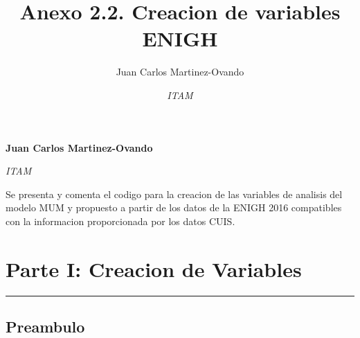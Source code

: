 \documentclass[11pt,]{article}
\title{Anexo 2.2. Creacion de variables ENIGH  }
\author{\Large Juan Carlos Martinez-Ovando\vspace{0.05in} \newline\normalsize\emph{}   \and \Large \vspace{0.05in} \newline\normalsize\emph{ITAM}  }
\date{}
\newcommand*{\authorfont}{\fontfamily{phv}\selectfont}
\renewenvironment{abstract}
 {{%
    \setlength{\leftmargin}{0mm}
    \setlength{\rightmargin}{\leftmargin}%
  }%
  \relax}
 {\endlist}
\begin{document}
	
%

{%
\setlength{\parindent}{0pt}
\thispagestyle{plain}
{\fontsize{18}{20}\selectfont\raggedright 
\maketitle  %

}

{
   \vskip 13.5pt\relax \normalsize\fontsize{11}{12} 
\textbf{\authorfont Juan Carlos Martinez-Ovando} \hskip 15pt \emph{\small }   \par \textbf{\authorfont } \hskip 15pt \emph{\small ITAM}   

}

}








\begin{abstract}

    \hbox{\vrule height .2pt width 39.14pc}

    \vskip 8.5pt %

\noindent Se presenta y comenta el codigo para la creacion de las variables de
analisis del modelo MUM y propuesto a partir de los datos de la ENIGH
2016 compatibles con la informacion proporcionada por los datos CUIS.


    \hbox{\vrule height .2pt width 39.14pc}


\end{abstract}


\vskip 6.5pt


\noindent  \section{Parte I: Creacion de
Variables}\label{parte-i-creacion-de-variables}

\begin{center}\rule{0.5\linewidth}{\linethickness}\end{center}

\subsection{Preambulo}\label{preambulo}
\end{document}
